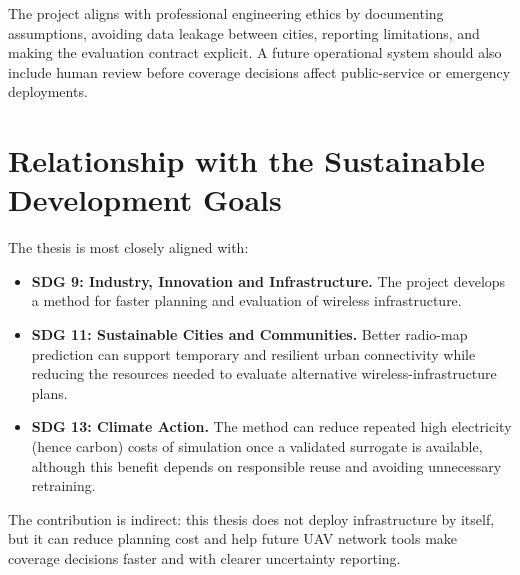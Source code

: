 The project aligns with professional engineering ethics by documenting
assumptions, avoiding data leakage between cities, reporting limitations, and
making the evaluation contract explicit. A future operational system should
also include human review before coverage decisions affect public-service or
emergency deployments.

\section{Relationship with the Sustainable Development Goals}

The thesis is most closely aligned with:

\begin{itemize}
  \item \textbf{SDG 9: Industry, Innovation and Infrastructure.} The project
  develops a method for faster planning and evaluation of wireless
  infrastructure.
  \item \textbf{SDG 11: Sustainable Cities and Communities.} Better radio-map
  prediction can support temporary and resilient urban connectivity while
  reducing the resources needed to evaluate alternative wireless-infrastructure
  plans.
  \item \textbf{SDG 13: Climate Action.} The method can reduce repeated
  high electricity (hence carbon) costs of simulation once a validated surrogate is available, although this
  benefit depends on responsible reuse and avoiding unnecessary retraining.
\end{itemize}

The contribution is indirect: this thesis does not deploy infrastructure by
itself, but it can reduce planning cost and help future UAV network tools make
coverage decisions faster and with clearer uncertainty reporting.

